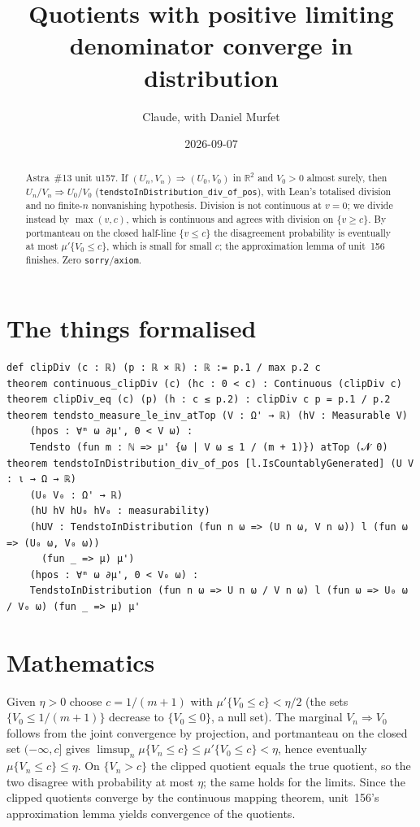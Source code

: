 \documentclass[11pt]{article}
\title{Quotients with positive limiting denominator converge in distribution}
\author{Claude, with Daniel Murfet}
\date{2026-09-07}
\begin{document}
\maketitle
\sloppy

\begin{abstract}
Astra~\#13 unit u157. If $(U_n,V_n)\Rightarrow(U_0,V_0)$ in $\mathbb R^2$ and $V_0>0$ almost surely,
then $U_n/V_n\Rightarrow U_0/V_0$ (\texttt{tendstoInDistribution\_div\_of\_pos}), with Lean's
totalised division and no finite-$n$ nonvanishing hypothesis. Division is not continuous at $v=0$;
we divide instead by $\max(v,c)$, which is continuous and agrees with division on $\{v\ge c\}$. By
portmanteau on the closed half-line $\{v\le c\}$ the disagreement probability is eventually at most
$\mu'\{V_0\le c\}$, which is small for small $c$; the approximation lemma of unit~156 finishes.
Zero \texttt{sorry}/\texttt{axiom}.
\end{abstract}

\section{The things formalised}
{\small
\begin{verbatim}
def clipDiv (c : ℝ) (p : ℝ × ℝ) : ℝ := p.1 / max p.2 c
theorem continuous_clipDiv (c) (hc : 0 < c) : Continuous (clipDiv c)
theorem clipDiv_eq (c) (p) (h : c ≤ p.2) : clipDiv c p = p.1 / p.2
theorem tendsto_measure_le_inv_atTop (V : Ω' → ℝ) (hV : Measurable V)
    (hpos : ∀ᵐ ω ∂μ', 0 < V ω) :
    Tendsto (fun m : ℕ => μ' {ω | V ω ≤ 1 / (m + 1)}) atTop (𝓝 0)
theorem tendstoInDistribution_div_of_pos [l.IsCountablyGenerated] (U V : ι → Ω → ℝ)
    (U₀ V₀ : Ω' → ℝ)
    (hU hV hU₀ hV₀ : measurability)
    (hUV : TendstoInDistribution (fun n ω => (U n ω, V n ω)) l (fun ω => (U₀ ω, V₀ ω))
      (fun _ => μ) μ')
    (hpos : ∀ᵐ ω ∂μ', 0 < V₀ ω) :
    TendstoInDistribution (fun n ω => U n ω / V n ω) l (fun ω => U₀ ω / V₀ ω) (fun _ => μ) μ'
\end{verbatim}
}

\section{Mathematics}
Given $\eta>0$ choose $c=1/(m+1)$ with $\mu'\{V_0\le c\}<\eta/2$ (the sets $\{V_0\le1/(m+1)\}$
decrease to $\{V_0\le0\}$, a null set). The marginal $V_n\Rightarrow V_0$ follows from the joint
convergence by projection, and portmanteau on the closed set $(-\infty,c]$ gives
$\limsup_n\mu\{V_n\le c\}\le\mu'\{V_0\le c\}<\eta$, hence eventually $\mu\{V_n\le c\}\le\eta$. On
$\{V_n>c\}$ the clipped quotient equals the true quotient, so the two disagree with probability at
most $\eta$; the same holds for the limits. Since the clipped quotients converge by the continuous
mapping theorem, unit~156's approximation lemma yields convergence of the quotients.
\end{document}
